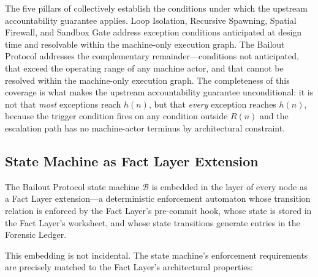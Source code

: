 The five pillars of \bxthree{} collectively establish the conditions under which the upstream accountability guarantee applies. Loop Isolation, Recursive Spawning, Spatial Firewall, and Sandbox Gate address exception conditions anticipated at design time and resolvable within the machine-only execution graph. The Bailout Protocol addresses the complementary remainder---conditions not anticipated, that exceed the operating range of any machine actor, and that cannot be resolved within the machine-only execution graph. The completeness of this coverage is what makes the upstream accountability guarantee unconditional: it is not that \emph{most} exceptions reach $h(n)$, but that \emph{every} exception reaches $h(n)$, because the trigger condition fires on any condition outside $R(n)$ and the escalation path has no machine-actor terminus by architectural constraint.

\subsection{State Machine as Fact Layer Extension}\label{sec:state-machine-fact-layer}

The Bailout Protocol state machine $\mathcal{B}$ is embedded in the \fact{} layer of every \bxthree{} node as a Fact Layer extension---a deterministic enforcement automaton whose transition relation is enforced by the Fact Layer's pre-commit hook, whose state is stored in the Fact Layer's worksheet, and whose state transitions generate entries in the Forensic Ledger.

This embedding is not incidental. The state machine's enforcement requirements are precisely matched to the Fact Layer's architectural properties:

